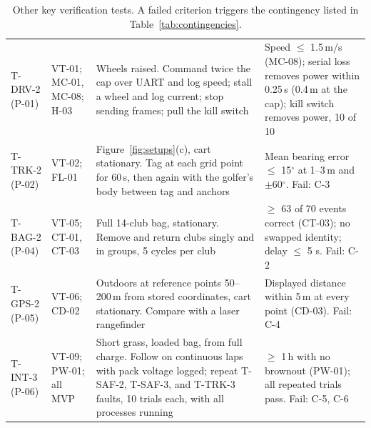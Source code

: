 \begin{table}[H]
\centering
\caption{Other key verification tests. A failed criterion triggers the contingency listed in Table~\ref{tab:contingencies}.}
\label{tab:tests-key}
\footnotesize\renewcommand{\arraystretch}{1.0}
\begin{tabularx}{\linewidth}{@{}L{0.56in} L{0.72in} Y Y@{}}
\toprule
{} &  &  &  \\
\midrule
\mbox{T-DRV-2} (P-01) & VT-01; MC-01, MC-08; H-03 & Wheels raised. Command twice the cap over \acs{UART} and log speed; stall a wheel and log current; stop sending frames; pull the kill switch & Speed $\le$ 1.5\,m/s (MC-08); serial loss removes power within 0.25\,s (0.4\,m at the cap); kill switch removes power, 10 of 10 \\
\addlinespace[2pt]
\mbox{T-TRK-2} (P-02) & VT-02; FL-01 & Figure~\ref{fig:setups}(c), cart stationary. Tag at each grid point for 60\,s, then again with the golfer's body between tag and anchors & Mean bearing error $\le$ 15$^\circ$ at 1--3\,m and $\pm$60$^\circ$. Fail: C-3 \\
\addlinespace[2pt]
\mbox{T-BAG-2} (P-04) & VT-05; CT-01, CT-03 & Full 14-club bag, stationary. Remove and return clubs singly and in groups, 5 cycles per club & $\ge$ 63 of 70 events correct (CT-03); no swapped identity; delay $\le$ 5 s. Fail: C-2 \\
\addlinespace[2pt]
\mbox{T-GPS-2} (P-05) & VT-06; CD-02 & Outdoors at reference points 50--200\,m from stored coordinates, cart stationary. Compare with a laser rangefinder & Displayed distance within 5\,m at every point (CD-03). Fail: C-4 \\
\addlinespace[2pt]
\mbox{T-INT-3} (P-06) & VT-09; PW-01; all \acs{MVP} & Short grass, loaded bag, from full charge. Follow on continuous laps with pack voltage logged; repeat \mbox{T-SAF-2}, \mbox{T-SAF-3}, and \mbox{T-TRK-3} faults, 10 trials each, with all processes running & $\ge$ 1\,h with no brownout (PW-01); all repeated trials pass. Fail: C-5, C-6 \\
\bottomrule
\end{tabularx}
\end{table}

